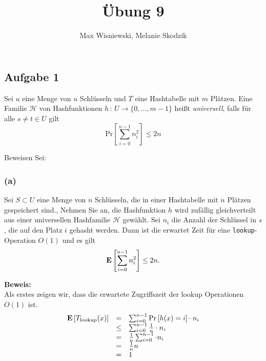 \documentclass[11pt,a4paper,ngerman]{article}
\date{}
\title{Übung 9}
\author{Max Wisniewski, Melanie Skodzik}
\newcommand{\erw}[1]{\text{\bfseries E} \left[ #1 \right]}
\newcommand{\prob}[1]{\text{Pr}\left[ #1 \right]}
\begin{document}

\renewcommand{\figurename}{Grafik}

\maketitle
\thispagestyle{fancy}


\subsection*{Aufgabe 1}

Sei $u$ eine Menge von $u$ Schlüsseln und $T$ eine Hashtabelle mit $m$ Plätzen. Eine Familie $\mathcal{H}$ von Hashfunktionen $h \, : \, U \rightarrow \{0, \ldots, m-1\}$ heißt \emph{universell}, falls für alle $s \not= t \in U$ gilt
$$
	\prob{\sum_{i=0}^{n-1} n_i^2 } \leq 2n
$$

Beweisen Sei:

\subsubsection*{(a)}
Sei $S \subset U$ eine Menge von $n$ Schlüsseln, die in einer Hashtabelle mit $n$ Plätzen gespeichert sind., Nehmen Sie an, die Hashfunktion $h$ wird zufällig gleichverteilt aus einer universellen Hashfamilie $\mathcal{H}$ gewählt. Sei $n_i$ die Anzahl der Schlüssel in $s$, die auf den Platz $i$ gehasht werden. Dann ist die erwartet Zeit für eine \lstinline|lookup|-Operation $O(1)$ und es gilt
	$$
		\erw{\sum_{i=0}^{n-1} n_i^2} \leq 2n.
	$$

\noindent\textbf{Beweis:}\\
Als erstes zeigen wir, dass die erwartete Zugriffszeit der lookup Operationen $O(1)$ ist.\\

$$\begin{array}{rcl}
	\erw{T_\text{lookup}(x)} &=& \sum_{i=0}^{n-1} \prob{h(x)=i} \cdot n_i\\
					&\leq& \sum_{i=0}^{n-1} \frac{1}{n} \cdot n_i\\
					&=& \frac{1}{n} \sum_{i=0}^{n-1} \cdot n_i\\
					&=& \frac{1}{n} n\\
					&=& 1
\end{array}$$
\end{document}

